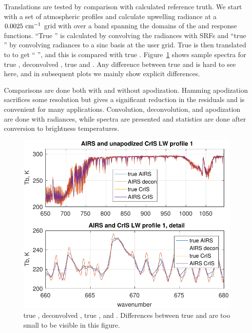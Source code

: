 \documentclass[10pt,twocolumn]{article}
\begin{document}
Translations are tested by comparison with calculated reference
truth.  We start with a set of atmospheric profiles and calculate
upwelling radiance at a $0.0025~\mbox{cm$^{-1}$}$ grid with {\kcarta}
\cite{kcarta1} over a band spanning the domains of the {\airs} and
{\cris} response functions.  ``True {\airs}'' is calculated by
convolving the {\kcarta} radiances with {\airs} SRFs and ``true
{\cris}'' by convolving {\kcarta} radiances to a sinc basis at the
{\cris} user grid.  True {\airs} is then translated to {\cris} to
get ``{\airs} {\cris}'', and this is compared with true {\cris}.
Figure~\ref{specLW} shows sample spectra for true {\airs},
deconvolved {\airs}, true {\cris} and {\airs} {\cris}.  Any
difference between true {\cris} and {\airs} {\cris} is hard to see
here, and in subsequent plots we mainly show explicit differences.

Comparisons are done both with and without apodization.  Hamming
apodization \cite{wiki:wind} sacrifices some resolution but gives a
significant reduction in the residuals and is convenient for many
applications.  Convolution, deconvolution, and apodization are done
with radiances, while spectra are presented and statistics are done
after conversion to brightness temperatures.

\begin{figure} %
  \centering
  \includegraphics[width=\linewidth]{figures/a2cris_spec_LW.pdf}
  \caption{true {\airs}, deconvolved {\airs}, true {\cris}, and {\airs}
    {\cris}.  Differences between true {\cris} and {\airs} {\cris} are too
    small to be visible in this figure.}
  \label{specLW}
\end{figure}
\end{document}
